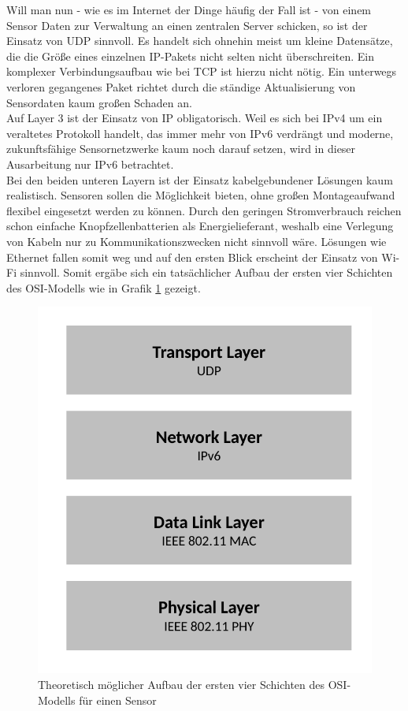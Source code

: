 Will man nun - wie es im Internet der Dinge häufig der Fall ist - von einem Sensor Daten zur Verwaltung an einen zentralen Server schicken, so ist der Einsatz von UDP sinnvoll. Es handelt sich ohnehin meist um kleine Datensätze, die die Größe eines einzelnen IP-Pakets nicht selten nicht überschreiten. Ein komplexer Verbindungsaufbau wie bei TCP ist hierzu nicht nötig. Ein unterwegs verloren gegangenes Paket richtet durch die ständige Aktualisierung von Sensordaten kaum großen Schaden an.\\
Auf Layer 3 ist der Einsatz von IP obligatorisch. Weil es sich bei IPv4 um ein veraltetes Protokoll handelt, das immer mehr von IPv6 verdrängt und moderne, zukunftsfähige Sensornetzwerke kaum noch darauf setzen, wird in dieser Ausarbeitung nur IPv6 betrachtet.\\
Bei den beiden unteren Layern ist der Einsatz kabelgebundener Lösungen kaum realistisch. Sensoren sollen die Möglichkeit bieten, ohne großen Montageaufwand flexibel eingesetzt werden zu können. Durch den geringen Stromverbrauch reichen schon einfache Knopfzellenbatterien als Energielieferant, weshalb eine Verlegung von Kabeln nur zu Kommunikationszwecken nicht sinnvoll wäre. Lösungen wie Ethernet fallen somit weg und auf den ersten Blick erscheint der Einsatz von Wi-Fi sinnvoll. Somit ergäbe sich ein tatsächlicher Aufbau der ersten vier Schichten des OSI-Modells wie in Grafik \ref{sensor-osi} gezeigt.
\begin{figure}
	\centering
	\includegraphics[width=\textwidth/2]{Grafiken-Alex/sensor-osi.pdf}
	\caption{Theoretisch möglicher Aufbau der ersten vier Schichten des OSI-Modells für einen Sensor}
	\label{sensor-osi}
\end{figure}
